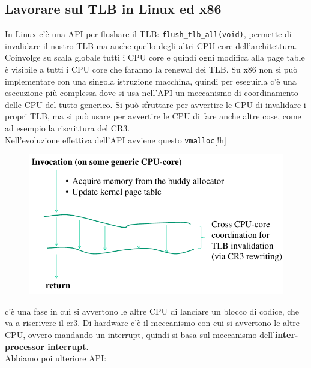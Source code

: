 \documentclass[12pt, oneside]{extbook}
\begin{document}
\subsection{Lavorare sul TLB in Linux ed x86}
In Linux c'è una API per flushare il TLB: \texttt{flush\_tlb\_all(void)}, permette di invalidare il nostro TLB ma anche quello degli altri CPU core dell'architettura. Coinvolge su scala globale tutti i CPU core e quindi ogni modifica alla page table è visibile a tutti i CPU core che faranno la renewal dei TLB. Su x86 non si può implementare con una singola istruzione macchina, quindi per eseguirla c'è una esecuzione più complessa dove si usa nell'API un meccanismo di coordinamento delle CPU del tutto generico. Si può sfruttare per avvertire le CPU di invalidare i propri TLB, ma si può usare per avvertire le CPU di fare anche altre cose, come ad esempio la riscrittura del CR3.\\ Nell'evoluzione effettiva dell'API avviene questo
\texttt{vmalloc}[!h]
\begin{figure}
	\includegraphics[scale=0.3]{immagini/tlb_flush_all_timeline.png}
\end{figure}
c'è una fase in cui si avvertono le altre CPU di lanciare un blocco di codice, che va a riscrivere il cr3. Di hardware c'è il meccanismo con cui si avvertono le altre CPU, ovvero mandando un interrupt, quindi si basa sul meccanismo dell'\textbf{inter-processor interrupt}.\\
Abbiamo poi ulteriore API:
\end{document}
